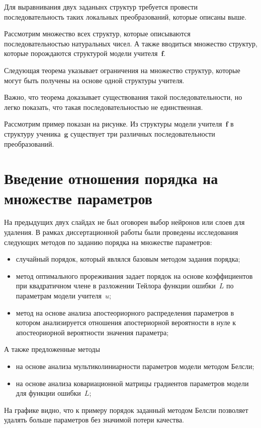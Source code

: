 \documentclass[10pt, twoside]{article}
\begin{document}
Для выравнивания двух заданынх структур требуется провести последовательность таких локальных преобразований, которые описаны выше.

Рассмотрим множество всех структур, которые описываются последовательностью натуральных чисел. А также вводиться множество структур, которые порождаются структурой модели учителя~$\mathbf{f}$.

Следующая теорема указывает ограничения на множество структур, которые могут быть получены на основе одной структуры учителя.

Важно, что теорема доказывает существования такой последовательности, но легко показать, что такая последовательностью не единственная.

Рассмотрим пример показан на рисунке. Из структуры модели учителя~$\mathbf{f}$ в структуру ученика~$\mathbf{g}$ существует три различных последовательности преобразований.

\section{Введение отношения порядка на множестве параметров}
На предыдущих двух слайдах не был оговорен выбор нейронов или слоев для удаления. В рамках диссертационной работы были проведены исследования следующих методов по заданию порядка на множестве параметров:
\begin{itemize}
    \item случайный порядок, который являлся базовым методом задания порядка;
    \item метод оптимального прореживания задает порядок на основе коэффициентов при квадратичном члене в разложении Тейлора функции ошибки~$L$ по параметрам модели учителя~$u$;
    \item метод на основе анализа апостеориорного распределения параметров в котором анализируется отношения апостериорной вероятности в нуле к апостеориорной вероятности значения параметра;
\end{itemize}
А также предложенные методы
\begin{itemize}
    \item на основе анализа мультиколиниарности параметров модели методом Белсли;
    \item на основе анализа ковариационной матрицы градиентов параметров модели для функции ошибки~$L$;
\end{itemize}

На графике видно, что к примеру порядок заданный методом Белсли позволяет удалять больше параметров без значимой потери качества.
\end{document}
